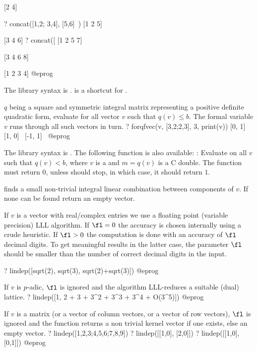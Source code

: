 [2 4]

? concat([1,2; 3,4], [5,6]~)
[1 2 5]

[3 4 6]
? concat([%
[1 2 5 7]

[3 4 6 8]

[1 2 3 4]
@eprog

The library syntax is .
 is a shortcut for .

\label{se:forqfvec}
$q$ being a square and symmetric integral matrix representing a positive
definite
quadratic form, evaluate  for all vector $v$ such that $q(v)\leq b$.
The formal variable $v$ runs through all such vectors in turn.
\bprog
? forqfvec(v, [3,2;2,3], 3, print(v))
[0, 1]~
[1, 0]~
[-1, 1]~
@eprog

The library syntax is .
The following function is also available:
:
Evaluate  on all $v$ such that $q(v)<b$, where $v$ is a
 and $m=q(v)$ is a C double. The function  must
return $0$, unless  should stop, in which case, it should
return $1$.

\label{se:lindep}
 finds a small non-trivial integral linear
combination between components of $v$. If none can be found return an empty
vector.

If $v$ is a vector with real/complex entries we use a floating point
(variable precision) LLL algorithm. If $\fl = 0$ the accuracy is chosen
internally using a crude heuristic. If $\fl > 0$ the computation is done with
an accuracy of $\fl$ decimal digits. To get meaningful results in the latter
case, the parameter $\fl$ should be smaller than the number of correct
decimal digits in the input.

\bprog
? lindep([sqrt(2), sqrt(3), sqrt(2)+sqrt(3)])
@eprog

If $v$ is $p$-adic, $\fl$ is ignored and the algorithm LLL-reduces a
suitable (dual) lattice.
\bprog
? lindep([1, 2 + 3 + 3^2 + 3^3 + 3^4 + O(3^5)])
@eprog

If $v$ is a matrix (or a vector of column vectors, or a vector of row
vectors), $\fl$ is ignored and the function returns a non trivial kernel
vector if one exists, else an empty vector.
\bprog
? lindep([1,2,3;4,5,6;7,8,9])
? lindep([[1,0], [2,0]])
? lindep([[1,0], [0,1]])
@eprog

